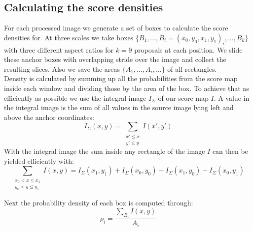\subsection{Calculating the score densities}
\label{sec:pipeline:eval:density}
For each processed image we generate a set of boxes to calculate the score densities for. At three scales we take boxes $\{B_1,\dotsc, B_i = (x_0, y_0, x_1, y_1)_i,\dotsc, B_k\}$ with three different aspect ratios for $k=9$ \citep{ren_faster_2015} proposals at each position. We slide these anchor boxes  with overlapping stride over the image and collect the resulting slices. Also we save the areas $\{A_1,\dotsc, A_i,\dotsc\}$ of all rectangles.\\
Density is calculated by summing up all the probabilities from the score map inside each window and dividing those by the area of the box. To achieve that as efficiently as possible we use the integral image $I_\Sigma$ of our score map $I$. A value in the integral image is the sum of all values in the source image lying left and above the anchor coordinates:
\begin{equation}
    I_\Sigma(x, y) = \sum_{\substack{x' \le x\\ y' \le y}} I(x', y')
\end{equation}
With the integral image the sum inside any rectangle of the image $I$ can then be yielded efficiently with:
\begin{equation}
    \sum_{\substack{x_0 < x \le x_1\\ y_0 < y \le y_1}}I(x,y) = I_\Sigma(x_1, y_1) + I_\Sigma(x_0, y_0) - I_\Sigma(x_1, y_0) - I_\Sigma(x_0, y_1)
\end{equation}

Next the probability density of each box is computed through:
\begin{equation}
    \rho_i = \frac{\sum_{B_i}I(x,y)}{A_i}
\end{equation}

